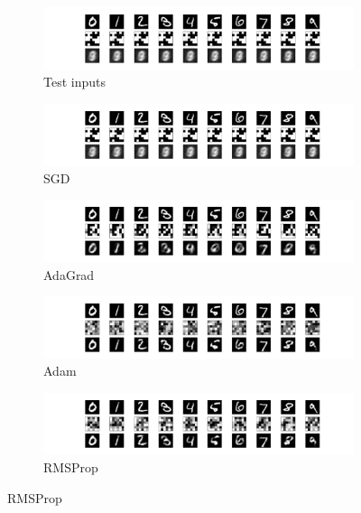 \begin{figure}[htbp]
  \centering
  \begin{subfigure}{0.48\figwidth}
    \includegraphics[width=\textwidth,trim={14em 15em 12em 2em},clip]{basic-36-tanh-sgd-xent.pdf}
    \caption{\label{Fig.opt.orig}Test inputs}
  \end{subfigure}

  \vspace{1em}
  
  \begin{subfigure}{0.48\figwidth}
    \includegraphics[width=\textwidth,trim={14em 2em 12em 16em},clip]{basic-36-tanh-sgd-xent.pdf}
    \caption{\label{Fig.opt.sgd}SGD}
  \end{subfigure}
  \begin{subfigure}{0.48\figwidth}
    \includegraphics[width=\textwidth,trim={14em 2em 12em 16em},clip]{basic-36-tanh-adagrad-xent.pdf}
    \caption{\label{Fig.opt.adagrad}AdaGrad}
  \end{subfigure}

  \vspace{1em}
  
  \begin{subfigure}{0.48\figwidth}
    \includegraphics[width=\textwidth,trim={14em 2em 12em 16em},clip]{basic-36-tanh-adam-xent.pdf}
    \caption{\label{Fig.opt.adam}Adam}
  \end{subfigure}
  \begin{subfigure}{0.48\figwidth}
    \includegraphics[width=\textwidth,trim={14em 2em 12em 16em},clip]{basic-36-tanh-rmsprop-xent.pdf}
    \caption{\label{Fig.opt.rmsprop}RMSProp}
  \end{subfigure}
 

\end{figure}
